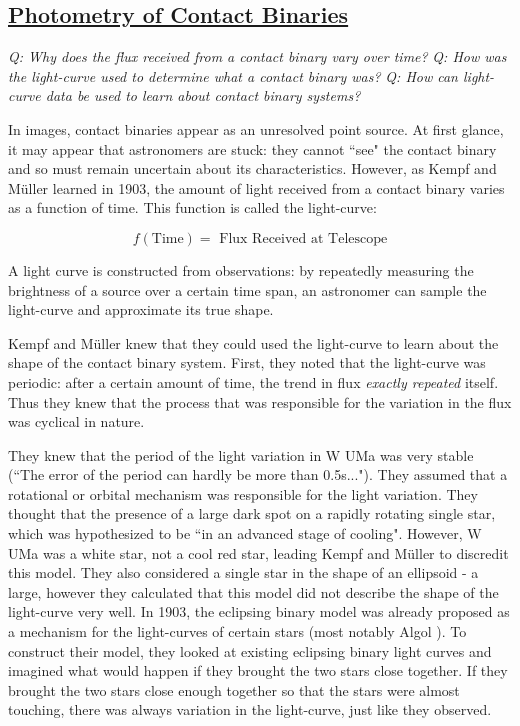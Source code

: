 \documentclass[12pt]{article} %
\numberwithin{equation}{section} %
\begin{document}
\subsection[Photometry of Contact Binaries]{\hyperlink{toc}{Photometry of Contact Binaries}} \label{sec: Photometry of Contact Binaries}

\emph{Q: Why does the flux received from a contact binary vary over time?}
\emph{Q: How was the light-curve used to determine what a contact binary was?}
\emph{Q: How can light-curve data be used to learn about contact binary systems? }

In images, contact binaries appear as an unresolved point source. At first glance, it may appear that astronomers are stuck: they cannot ``see" the contact binary and so must remain uncertain about its characteristics. However, as Kempf and M\"{u}ller learned in 1903, the amount of light received from a contact binary varies as a function of time. This function is called the light-curve: 

\begin{equation} \label{eqn: light_curve}
f(\text{Time}) = \text{ Flux Received at Telescope}
\end{equation}

A light curve is constructed from observations: by repeatedly measuring the brightness of a source over a certain time span, an astronomer can sample the light-curve and approximate its true shape.

Kempf and M\"{u}ller knew that they could used the light-curve to learn about the shape of the contact binary system. First, they noted that the light-curve was periodic: after a certain amount of time, the trend in flux \emph{exactly repeated} itself. Thus they knew that the process that was responsible for the variation in the flux was cyclical in nature. 

They knew that the period of the light variation in W UMa was very stable (``The error of the period can hardly be more than 0.5s..."). They assumed that a rotational or orbital mechanism was responsible for the light variation. They thought that the presence of a large dark spot on a rapidly rotating single star, which was hypothesized to be ``in an advanced stage of cooling". However, W UMa was a white star, not a cool red star, leading Kempf and M\"{u}ller to discredit this model. They also considered a single star in the shape of an ellipsoid - a large, however they calculated that this model did not describe the shape of the light-curve very well. In 1903, the eclipsing binary model was already proposed as a mechanism for the light-curves of certain stars (most notably Algol ). To construct their model, they looked at existing eclipsing binary light curves and imagined what would happen if they brought the two stars close together. If they brought the two stars close enough together so that the stars were almost touching, there was always variation in the light-curve, just like they observed.
\end{document}
